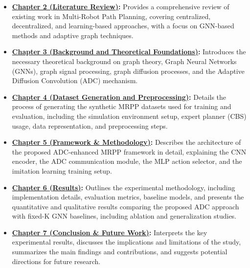 \begin{itemize}
    \item \textbf{\hyperref[chap:literature_review]{Chapter 2 (Literature Review)}:} Provides a comprehensive review of existing work in Multi-Robot Path Planning, covering centralized, decentralized, and learning-based approaches, with a focus on GNN-based methods and adaptive graph techniques.

    \item \textbf{\hyperref[chap:background]{Chapter 3 (Background and Theoretical Foundations)}:} Introduces the necessary theoretical background on graph theory, Graph Neural Networks (GNNs), graph signal processing, graph diffusion processes, and the Adaptive Diffusion Convolution (ADC) mechanism.

    \item \textbf{\hyperref[chap:dataset]{Chapter 4 (Dataset Generation and Preprocessing)}:} Details the process of generating the synthetic MRPP datasets used for training and evaluation, including the simulation environment setup, expert planner (CBS) usage, data representation, and preprocessing steps.

    \item \textbf{\hyperref[chap:methodology]{Chapter 5 (Framework \& Methodology)}:} Describes the architecture of the proposed ADC-enhanced MRPP framework in detail, explaining the CNN encoder, the ADC communication module, the MLP action selector, and the imitation learning training setup.

    \item \textbf{\hyperref[chap:results]{Chapter 6 (Results)}:} Outlines the experimental methodology, including implementation details, evaluation metrics, baseline models, and presents the quantitative and qualitative results comparing the proposed ADC approach with fixed-K GNN baselines, including ablation and generalization studies.

    \item \textbf{\hyperref[chap:conclusion]{Chapter 7 (Conclusion \& Future Work)}:} Interprets the key experimental results, discusses the implications and limitations of the study, summarizes the main findings and contributions, and suggests potential directions for future research.
\end{itemize}
